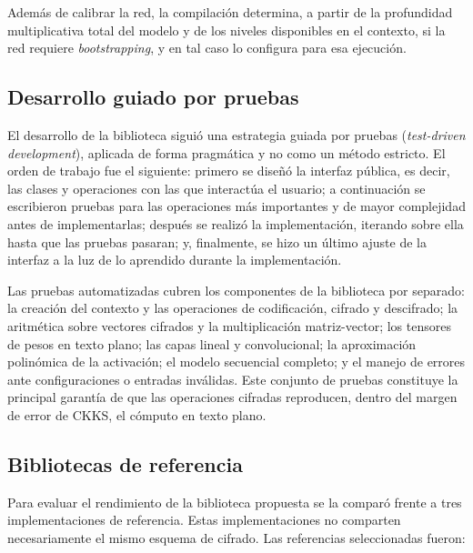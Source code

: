 Además de calibrar la red, la compilación determina, a partir de la profundidad multiplicativa total del modelo y de los niveles disponibles en el contexto, si la red requiere \textit{bootstrapping}, y en tal caso lo configura para esa ejecución.

\subsection{Desarrollo guiado por pruebas}\label{sec:metodo_tdd}

El desarrollo de la biblioteca siguió una estrategia guiada por pruebas (\textit{test-driven development}), aplicada de forma pragmática y no como un método estricto. El orden de trabajo fue el siguiente: primero se diseñó la interfaz pública, es decir, las clases y operaciones con las que interactúa el usuario; a continuación se escribieron pruebas para las operaciones más importantes y de mayor complejidad antes de implementarlas; después se realizó la implementación, iterando sobre ella hasta que las pruebas pasaran; y, finalmente, se hizo un último ajuste de la interfaz a la luz de lo aprendido durante la implementación.

Las pruebas automatizadas cubren los componentes de la biblioteca por separado: la creación del contexto y las operaciones de codificación, cifrado y descifrado; la aritmética sobre vectores cifrados y la multiplicación matriz-vector; los tensores de pesos en texto plano; las capas lineal y convolucional; la aproximación polinómica de la activación; el modelo secuencial completo; y el manejo de errores ante configuraciones o entradas inválidas. Este conjunto de pruebas constituye la principal garantía de que las operaciones cifradas reproducen, dentro del margen de error de CKKS, el cómputo en texto plano.

\subsection{Bibliotecas de referencia}\label{sec:metodo_bibliotecas}

Para evaluar el rendimiento de la biblioteca propuesta se la comparó frente a tres implementaciones de referencia. Estas implementaciones no comparten necesariamente el mismo esquema de cifrado. Las referencias seleccionadas fueron:

